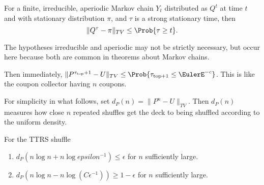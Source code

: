 \documentclass[12pt]{article}
\begin{document}
\begin{theorem}
    For a finite, irreducible, aperiodic Markov chain \( Y_t \)
    distributed as \( Q^t \) at time \( t \) and with stationary
    distribution \( \pi \), and \( \tau \) is a strong stationary time,
    then
    \[
        \| Q^{\tau} - \pi \|_{TV} \le \Prob{\tau \ge t}.
    \]
\end{theorem}

\begin{remark}
    The hypotheses irreducible and aperiodic may not be strictly
    necessary, but occur here because both are common in theorems about
    Markov chains.
\end{remark}

Then immediately, \( \| P^{\tau_{\text{top}}+1} - U \|_{TV} \le \Prob{\tau_
{\text{top}+1} \le \EulerE^{-c}} \).  This is like the coupon collector
having \( n \) coupons.

For simplicity in what follows, set \( d_P(n) = \| P^n - U \|_{TV} \).
Then \( d_P(n) \) measures how close \( n \) repeated shuffles get the
deck to being shuffled according to the uniform density.

\begin{theorem}
    For the TTRS shuffle
    \begin{enumerate}
        \item
            \( d_P(n \log n + n \log epsilon^{-1} )\le \epsilon \) for \(
            n \) sufficiently large.
        \item
            \( d_P(n \log n - n \log (C \epsilon^{-1})) \ge 1-\epsilon \)
            for \( n \) sufficiently large.
    \end{enumerate}
\end{theorem}
\end{document}
